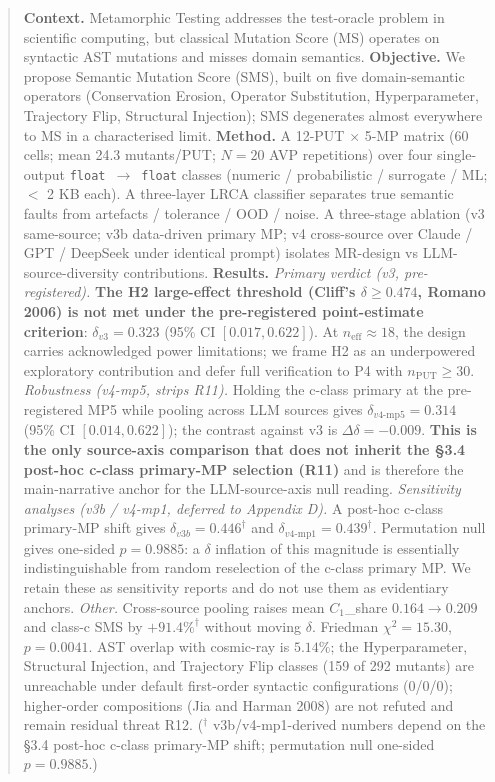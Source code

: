 \documentclass[review,12pt,authoryear]{elsarticle}
\begin{document}
\begin{frontmatter}
\begin{abstract}
\noindent\textbf{Context.} Metamorphic Testing addresses the test-oracle problem in scientific computing, but classical Mutation Score (MS) operates on syntactic AST mutations and misses domain semantics.
\textbf{Objective.} We propose Semantic Mutation Score (SMS), built on five domain-semantic operators (Conservation Erosion, Operator Substitution, Hyperparameter, Trajectory Flip, Structural Injection); SMS degenerates almost everywhere to MS in a characterised limit.
\textbf{Method.} A 12-PUT $\times$ 5-MP matrix (60 cells; mean 24.3 mutants/PUT; $N=20$ AVP repetitions) over four single-output \texttt{float}~$\to$~\texttt{float} classes (numeric / probabilistic / surrogate / ML; $<$ 2 KB each). A three-layer LRCA classifier separates true semantic faults from artefacts / tolerance / OOD / noise. A three-stage ablation (v3 same-source; v3b data-driven primary MP; v4 cross-source over Claude / GPT / DeepSeek under identical prompt) isolates MR-design vs LLM-source-diversity contributions.
\textbf{Results.}
\textit{Primary verdict (v3, pre-registered).} \textbf{The H2 large-effect threshold (Cliff's $\delta \geq 0.474$, Romano 2006) is not met under the pre-registered point-estimate criterion}: $\delta_{v3} = 0.323$ (95\% CI $[0.017, 0.622]$). At $n_{\text{eff}} \approx 18$, the design carries acknowledged power limitations; we frame H2 as an underpowered exploratory contribution and defer full verification to P4 with $n_{\text{PUT}} \geq 30$.
\textit{Robustness (v4-mp5, strips R11).} Holding the c-class primary at the pre-registered MP5 while pooling across LLM sources gives $\delta_{v4\text{-mp5}} = 0.314$ (95\% CI $[0.014, 0.622]$); the contrast against v3 is $\Delta\delta = -0.009$. \textbf{This is the only source-axis comparison that does not inherit the \S3.4 post-hoc c-class primary-MP selection (R11)} and is therefore the main-narrative anchor for the LLM-source-axis null reading.
\textit{Sensitivity analyses (v3b / v4-mp1, deferred to Appendix D).} A post-hoc c-class primary-MP shift gives $\delta_{v3b} = 0.446^{\dagger}$ and $\delta_{v4\text{-mp1}} = 0.439^{\dagger}$. Permutation null gives one-sided $p = 0.9885$: a $\delta$ inflation of this magnitude is essentially indistinguishable from random reselection of the c-class primary MP. We retain these as sensitivity reports and do not use them as evidentiary anchors.
\textit{Other.} Cross-source pooling raises mean $C_1$\_share $0.164 \to 0.209$ and class-c SMS by $+91.4\%^{\dagger}$ without moving $\delta$. Friedman $\chi^2 = 15.30$, $p = 0.0041$. AST overlap with cosmic-ray is $5.14\%$; the Hyperparameter, Structural Injection, and Trajectory Flip classes (159 of 292 mutants) are unreachable under default first-order syntactic configurations (0/0/0); higher-order compositions (Jia and Harman 2008) are not refuted and remain residual threat R12. ($^{\dagger}$ v3b/v4-mp1-derived numbers depend on the \S3.4 post-hoc c-class primary-MP shift; permutation null one-sided $p = 0.9885$.)

\end{abstract}
\end{frontmatter}
\end{document}
